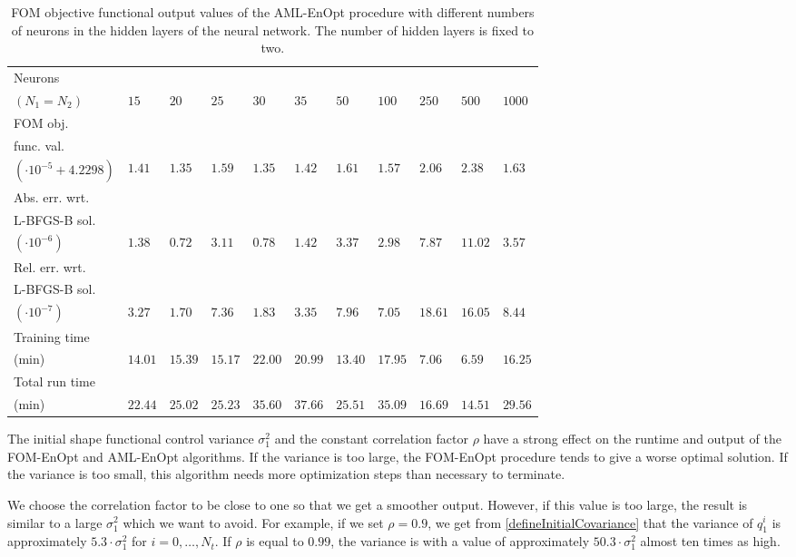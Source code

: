 \begin{table}
\caption{\label{DNNStructFOMComparison} FOM objective functional output values of the AML-EnOpt procedure with different numbers of neurons in the hidden layers of the neural network. The number of hidden layers is fixed to two.}
\centering
\begin{tabular}{|l|llllllllll|}
\hline
Neurons&&&&&&&&&&\\
$(N_1=N_2)$& $15$ & $20$ & $25$ & $30$ & $35$ & $50$ & $100$ & $250$ & $500$ & $1000$\\
\hline
FOM obj.&&&&&&&&&&\\
func. val.&&&&&&&&&&\\
$(\cdot 10^{-5}+4.2298)$& $1.41$ & $1.35$ & $1.59$ & $1.35$ & $1.42$ & $1.61$ & $1.57$ & $2.06$ & $2.38$ & $1.63$\\
\hline
Abs. err. wrt.&&&&&&&&&&\\
L-BFGS-B sol.&&&&&&&&&&\\
$(\cdot 10^{-6})$& $1.38$ & $0.72$ & $3.11$ & $0.78$ & $1.42$ & $3.37$ & $2.98$ & $7.87$ & $11.02$ & $3.57$\\
\hline
Rel. err. wrt.&&&&&&&&&&\\
L-BFGS-B sol.&&&&&&&&&&\\
$(\cdot 10^{-7})$& $3.27$ & $1.70$ & $7.36$ & $1.83$ & $3.35$ & $7.96$ & $7.05$ & $18.61$ & $16.05$ & $8.44$\\
\hline
Training time&&&&&&&&&&\\
(min)& $14.01$ & $15.39$ & $15.17$ & $22.00$ & $20.99$ & $13.40$ & $17.95$ & $7.06$ & $6.59$ & $16.25$\\
\hline
Total run time&&&&&&&&&&\\
(min)& $22.44$ & $25.02$ & $25.23$ & $35.60$ & $37.66$ & $25.51$ & $35.09$ & $16.69$ & $14.51$ & $29.56$\\
\hline
\end{tabular}
\end{table}

The initial shape functional control variance $\sigma^2_1$ and the constant correlation factor $\rho$ have a strong effect on the runtime and output of the FOM-EnOpt and AML-EnOpt algorithms. If the variance is too large, the FOM-EnOpt procedure tends to give a worse optimal solution. If the variance is too small, this algorithm needs more optimization steps than necessary to terminate.

We choose the correlation factor to be close to one so that we get a smoother output. However, if this value is too large, the result is similar to a large $\sigma^2_1$ which we want to avoid. For example, if we set $\rho=0.9$, we get from \eqref{defineInitialCovariance} that the variance of $q^i_1$ is approximately $5.3\cdot\sigma^2_1$ for $i=0,\dotsc,N_t$. If $\rho$ is equal to $0.99$, the variance is with a value of approximately $50.3\cdot\sigma^2_1$ almost ten times as high.

